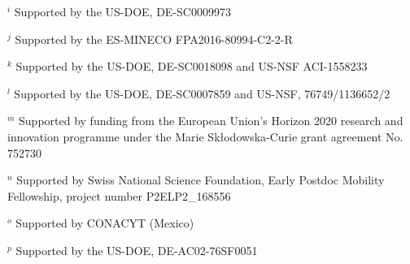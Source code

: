\par {\footnotesize $^{i}$ Supported by the US-DOE, DE-SC0009973}
\par {\footnotesize $^{j}$ Supported by the ES-MINECO FPA2016-80994-C2-2-R}
\par {\footnotesize $^{k}$ Supported by the US-DOE, DE-SC0018098 and US-NSF ACI-1558233}
\par {\footnotesize $^{l}$ Supported by the US-DOE, DE-SC0007859 and US-NSF, 76749/1136652/2}
\par {\footnotesize $^{m}$ Supported by funding from the European Union’s Horizon 2020 research and innovation programme under the Marie Skłodowska-Curie grant agreement No. 752730}
\par {\footnotesize $^{n}$ Supported by Swiss National Science Foundation, Early Postdoc Mobility Fellowship, project number P2ELP2\_168556}
\par {\footnotesize $^{o}$ Supported by CONACYT (Mexico)}
\par {\footnotesize $^{p}$ Supported by the US-DOE, DE-AC02-76SF0051}
